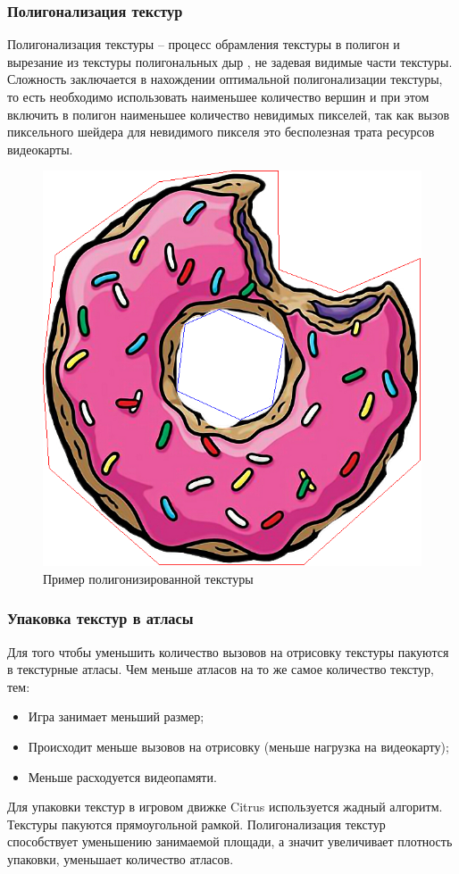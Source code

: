 \documentclass{fefu_thesis/cls/fefu}
\begin{document}
    \subsubsection{Полигонализация текстур}
    Полигонализация текстуры -- процесс обрамления текстуры в полигон и вырезание из текстуры полигональных дыр , не задевая видимые части текстуры. Сложность заключается в нахождении оптимальной полигонализации текстуры, то есть необходимо использовать наименьшее количество вершин и при этом включить в полигон наименьшее количество невидимых пикселей, так как вызов пиксельного шейдера для невидимого пикселя это бесполезная трата ресурсов видеокарты.
    \begin{figure}[H]
        \centering
        \includegraphics[scale=0.5]{images/donut_polygonized.png}
        \caption{Пример полигонизированной текстуры}
    \end{figure}
    \subsubsection{Упаковка текстур в атласы}
    Для того чтобы уменьшить количество вызовов на отрисовку текстуры пакуются в текстурные атласы. Чем меньше атласов на то же самое количество текстур, тем:
    \begin{itemize}
        \item Игра занимает меньший размер;
        \item Происходит меньше вызовов на отрисовку (меньше нагрузка на видеокарту);
        \item Меньше расходуется видеопамяти.
    \end{itemize}
    Для упаковки текстур в игровом движке Citrus используется жадный алгоритм. Текстуры пакуются прямоугольной рамкой. Полигонализация текстур способствует уменьшению занимаемой площади, а значит увеличивает плотность упаковки, уменьшает количество атласов.
\end{document}
